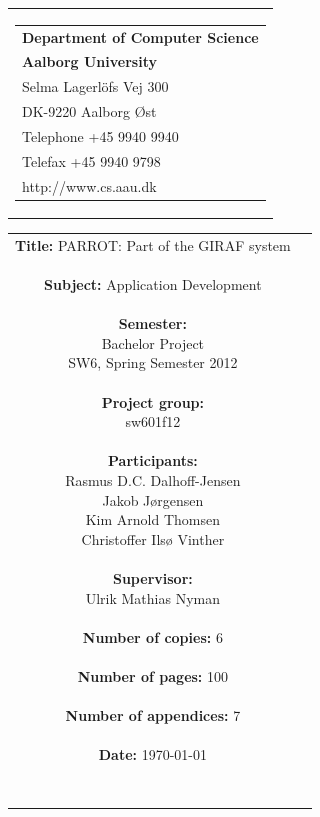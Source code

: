 \begin{nopagebreak}
\samepage 
\begin{tabular}{r}
\parbox{\textwidth}{
\hfill \parbox{6.2cm}{\begin{tabular}{l}
{\textsf\small \textbf{Department of Computer Science }}\\
{\textsf\small  \textbf{Aalborg University}}\\
{\textsf\small Selma Lagerlöfs Vej 300}\\
{\textsf\small DK-9220 Aalborg Øst}\\
{\textsf\small Telephone +45 9940 9940}\\
{\textsf\small Telefax +45 9940 9798}\\
{\textsf\small http://www.cs.aau.dk}
\end{tabular}}}
\end{tabular}

\begin{tabular}{cc}
\parbox{7cm}{
\textbf{Title:} 
PARROT: Part of the GIRAF system\\ \\
\textbf{Subject:} 
Application Development \\ \\
\textbf{Semester:} \\
Bachelor Project \\
SW6, Spring Semester 2012\\ \\
\textbf{Project group:} \\
sw601f12\\ \\
\textbf{Participants:} \\
Rasmus D.C. Dalhoff-Jensen \\
Jakob J\o{}rgensen \\
Kim Arnold Thomsen \\
Christoffer Ils\o{} Vinther\\ \\
\textbf{Supervisor:} \\
Ulrik Mathias Nyman\\ \\
\textbf{Number of copies:}
6 \\ \\
\textbf{Number of pages:}
100 \\ \\
\textbf{Number of appendices:}
7 \\ \\
\textbf{Date:}
{\large \today} \\ \\ \\
}


\end{tabular}
\end{nopagebreak}
